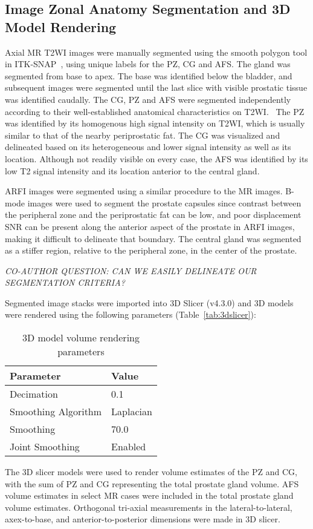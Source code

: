 \subsection{Image Zonal Anatomy Segmentation and 3D Model Rendering}
Axial MR T2WI images were manually segmented using the smooth polygon tool in
ITK-SNAP~\cite{Yushkevich2006}, using unique labels for the PZ, CG and AFS. The
gland was segmented from base to apex.  The base was identified below the
bladder, and subsequent images were segmented until the last slice with visible
prostatic tissue was identified caudally. The CG, PZ and AFS were segmented
independently according to their well-established anatomical characteristics on
T2WI.~\cite{Verma2011,Jung2012,Poon1985,Hricak2007,Bonekamp2011} The PZ was
identified by its homogenous high signal intensity on T2WI, which is usually
similar to that of the nearby periprostatic fat. The CG was visualized and
delineated based on its heterogeneous and lower signal intensity as well as its
location. Although not readily visible on every case, the AFS was identified by
its low T2 signal intensity and its location anterior to the central gland. 

ARFI images were segmented using a similar procedure to the MR images.  B-mode
images were used to segment the prostate capsules since contrast between the
peripheral zone and the periprostatic fat can be low, and poor displacement SNR
can be present along the anterior aspect of the prostate in ARFI images, making
it difficult to delineate that boundary.  The central gland was segmented as a
stiffer region, relative to the peripheral zone, in the center of the prostate.

\emph{CO-AUTHOR QUESTION: CAN WE EASILY DELINEATE OUR SEGMENTATION CRITERIA?}

Segmented image stacks were imported into 3D Slicer (v4.3.0) and 3D
models were rendered using the following parameters (Table~\ref{tab:3dslicer}):

\begin{table}[h!]
\centering
\caption{3D model volume rendering parameters}
\begin{tabular}{ll}
{\bf Parameter} & {\bf Value} \\ \hline
Decimation & 0.1 \\
Smoothing Algorithm & Laplacian \\
Smoothing  & 70.0 \\
Joint Smoothing & Enabled \\
\end{tabular}
\end{table}

The 3D slicer models were used to render volume estimates of the PZ and CG,
with the sum of PZ and CG representing the total prostate gland volume.  AFS
volume estimates in select MR cases were included in the total prostate gland
volume estimates.  Orthogonal tri-axial measurements in the lateral-to-lateral,
axex-to-base, and anterior-to-posterior dimensions were made in 3D slicer.
